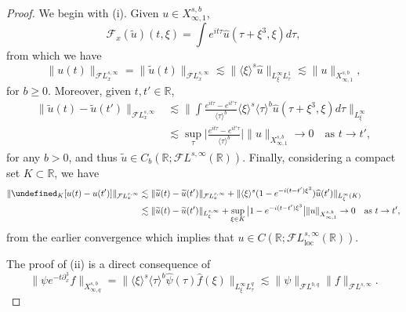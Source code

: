 \documentclass[%
11pt,  reqno]{amsart}
\newcommand{\jap}[1]{\langle #1 \rangle}
\newcommand{\5}{\textup{V}}
\newcommand{\FL}{\mathcal{F} L}
\newcommand{\ft}{\widehat}
\newcommand{\les}{\lesssim}
\newcommand{\wt}{\widetilde}
\theoremstyle{remark}
\newcommand{\R}{\mathbb{R}}
\let\P= \undefined
\newcommand{\P}{\mathbf{P}}
\newcommand{\Ft}{{\mathcal{F}}}
\newcommand{\jb}[1]
{\langle #1 \rangle}
\numberwithin{equation}{section}
\numberwithin{theorem}{section}
\begin{document}
		\begin{proof}
			
			We begin with (i). Given $u\in X^{s,b}_{\infty,1}$,
			$$
            \Ft_x(\wt u)(t,\xi) = \int e^{it\tau}\ft{u}(\tau+\xi^3,\xi)d\tau, 
			$$ 
            from which we have
$$\| u(t)\|_{\FL^{s,\infty}_x} = \|\wt{u}(t)\|_{\FL^{s,\infty}_x} \lesssim \|\jap{\xi}^s\ft {u}\|_{L^\infty_\xi L^1_\tau} \les \|u\|_{X^{s,b}_{\infty,1}}, 
			$$
            for $b\ge 0$. 
			Moreover, given $t,t'\in\R$,
			\begin{align*}
				\|\wt{u}(t)-\wt{u}(t')\|_{\FL_x^{s,\infty}} &\lesssim \bigg\|\int \frac{e^{it\tau}-e^{it'\tau}}{\jap{\tau}^b}\jap{\xi}^s\jap{\tau}^b\ft{u}(\tau+\xi^3,\xi)d\tau\bigg\|_{L^\infty_\xi}\\&\lesssim \sup_{\tau} \bigg| \frac{e^{it\tau}-e^{it'\tau}}{\jap{\tau}^b}\bigg| \|u\|_{X^{s,b}_{\infty,1}} \to 0 \quad \mbox{as }t\to t',
			\end{align*}
            for any $b>0$, 
			and thus $\wt{u}\in C_b(\R;\FL^{s,\infty}(\R))$. Finally, considering a compact set $K\subset \R$, we have
			\begin{align*}
				\| \P_K [u(t)-u(t')]\|_{\mathcal{F}L^{s,\infty}_x} 
                &
                \lesssim \|\wt{u}(t)-\wt{u}(t')\|_{\FL^{s,\infty}_x} 
                + \|\jb{\xi}^s (1-e^{-i(t-t')\xi^3})\ft{u}(t')\|_{L^{\infty}_\xi(K) } \\&\lesssim \|\wt{u}(t)-\wt{u}(t')\|_{L^{s,\infty}_\xi} + \sup_{\xi\in K}\big|1 -e^{-i (t-t')\xi^3}\big| \| u \|_{X^{s,b}_{\infty,1}} \to 0\quad \mbox{as }t\to t', 
			\end{align*}
            from the earlier convergence 
			which implies that $u\in C(\R;\mathcal{F}L^{s,\infty}_{\mathrm{loc}}(\R))$. 


            The proof of (ii) is a direct consequence of
			$$
			\|\psi e^{-t\partial_x^3}f\|_{X^{s,b}_{\infty,q}} = \|\jap{\xi}^s\jap{\tau}^b\ft{\psi}(\tau)\ft{f}(\xi)\|_{L^\infty_\xi L^q_\tau} \lesssim \|\psi\|_{\FL^{b,q}} \|f\|_{\FL^{s,\infty}}.
			$$

            
            
            
			\smallskip
			

\end{proof}
\end{document}
